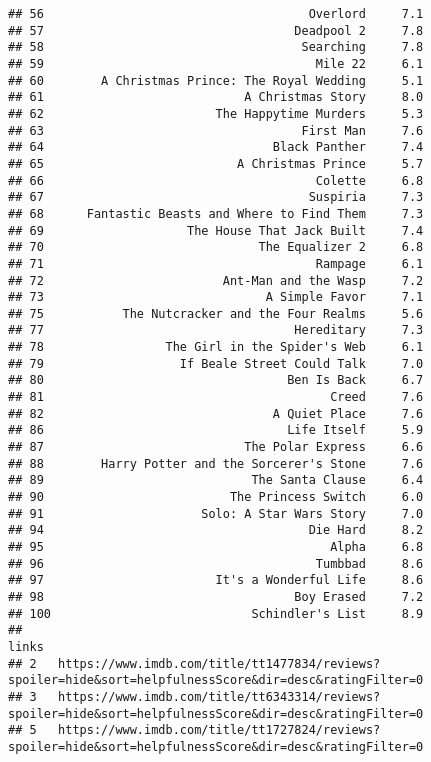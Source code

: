 \documentclass[]{article}
\begin{document}
\begin{verbatim}
## 56                                     Overlord     7.1
## 57                                   Deadpool 2     7.8
## 58                                    Searching     7.8
## 59                                      Mile 22     6.1
## 60        A Christmas Prince: The Royal Wedding     5.1
## 61                            A Christmas Story     8.0
## 62                        The Happytime Murders     5.3
## 63                                    First Man     7.6
## 64                                Black Panther     7.4
## 65                           A Christmas Prince     5.7
## 66                                      Colette     6.8
## 67                                     Suspiria     7.3
## 68      Fantastic Beasts and Where to Find Them     7.3
## 69                    The House That Jack Built     7.4
## 70                              The Equalizer 2     6.8
## 71                                      Rampage     6.1
## 72                         Ant-Man and the Wasp     7.2
## 73                               A Simple Favor     7.1
## 75           The Nutcracker and the Four Realms     5.6
## 77                                   Hereditary     7.3
## 78                 The Girl in the Spider's Web     6.1
## 79                   If Beale Street Could Talk     7.0
## 80                                  Ben Is Back     6.7
## 81                                        Creed     7.6
## 82                                A Quiet Place     7.6
## 86                                  Life Itself     5.9
## 87                            The Polar Express     6.6
## 88        Harry Potter and the Sorcerer's Stone     7.6
## 89                             The Santa Clause     6.4
## 90                          The Princess Switch     6.0
## 91                      Solo: A Star Wars Story     7.0
## 94                                     Die Hard     8.2
## 95                                        Alpha     6.8
## 96                                      Tumbbad     8.6
## 97                        It's a Wonderful Life     8.6
## 98                                   Boy Erased     7.2
## 100                            Schindler's List     8.9
##                                                                                                       links
## 2   https://www.imdb.com/title/tt1477834/reviews?spoiler=hide&sort=helpfulnessScore&dir=desc&ratingFilter=0
## 3   https://www.imdb.com/title/tt6343314/reviews?spoiler=hide&sort=helpfulnessScore&dir=desc&ratingFilter=0
## 5   https://www.imdb.com/title/tt1727824/reviews?spoiler=hide&sort=helpfulnessScore&dir=desc&ratingFilter=0

\end{verbatim}
\end{document}
